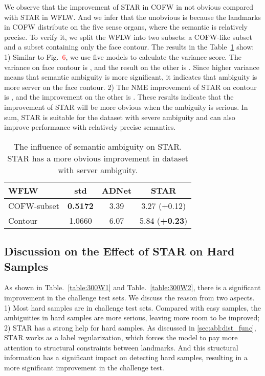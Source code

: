 \documentclass[10pt,twocolumn,letterpaper]{article}
\begin{document}
We observe that the improvement of STAR in COFW in not obvious compared with STAR in WFLW.
And we infer that the unobvious is because the landmarks in COFW distribute on the five sense organs, where the semantic is relatively precise.
To verify it, we split the WFLW into two subsets: a COFW-like subset and a subset containing only the face contour. 
The results in the Table~\ref{tab:appendix:star} show:
1) Similar to Fig.~\textcolor{red}{6}, we use five models to calculate the variance score. The variance on face contour is , and the result on the other is . 
Since higher variance means that semantic ambiguity is more significant, it indicates that ambiguity is more server on the face contour. 
2) The NME improvement of STAR on contour is , and the improvement on the other is .
These results indicate that the improvement of STAR will be more obvious when the ambiguity is serious.
In sum, STAR is suitable for the dataset with severe ambiguity and can also improve performance with relatively precise semantics.

\begin{table}[h]
    \centering
    \begin{tabular}{l|c|cc}
WFLW   & std & ADNet & STAR \\
\hline
    COFW-subset & \textbf{0.5172} & 3.39 & 3.27 (+0.12) \\
    Contour     & 1.0660 & 6.07 & 5.84 (\textbf{+0.23}) \\
\end{tabular}
    \caption{The influence of semantic ambiguity on STAR. STAR has a more obvious improvement in dataset with server ambiguity.}
    \label{tab:appendix:star}
\end{table}

\subsection{Discussion on the Effect of STAR on Hard Samples}
As shown in Table.~\ref{table:300W1} and Table.~\ref{table:300W2}, there is a significant improvement in the challenge test sets.
We discuss the reason from two aspects.
1) Most hard samples are in challenge test sets. Compared with easy samples, the ambiguities in hard samples are more serious, leaving more room to be improved;
2) STAR has a strong help for hard samples. As discussed in \cref{sec:abl:dist_func}, STAR works as a label regularization, which forces the model to pay more attention to structural constraints between landmarks. And this structural information has a significant impact on detecting hard samples, resulting in a more significant improvement in the challenge test.
\end{document}
